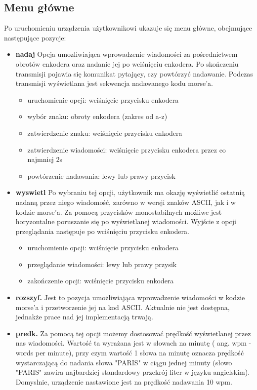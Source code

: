 \documentclass{article}
\begin{document}
\subsection{Menu główne}
Po uruchomieniu urządzenia użytkownikowi ukazuje się menu główne, obejmujące następujące pozycje:

\begin{itemize}
	\item	\textbf{nadaj}\newline
Opcja umozliwiająca wprowadzenie wiadomości za pośrednictwem obrotów enkodera oraz nadanie jej po wciśnięciu enkodera. Po skończeniu transmisji pojawia się komunikat pytający, czy powtórzyć nadawanie. Podczas transmisji wyświetlana jest sekwencja nadawanego kodu morse'a.

	\begin{itemize}
	\item uruchomienie opcji: wciśnięcie przycisku enkodera
	\item wybór znaku: obroty enkodera (zakres od a-z)
	\item zatwierdzenie znaku: wciśnięcie przycisku enkodera
	\item zatwierdzenie wiadomości: wciśnięcie przycisku enkodera przez co najmniej 2s
	\item powtórzenie nadawania: lewy lub prawy przycisk
	\end{itemize}

	\item	\textbf{wyswietl}\newline
Po wybraniu tej opcji, użytkownik ma okazję wyświetlić ostatnią nadaną przez niego wiadomość, zarówno w wersji znaków ASCII, jak i w kodzie morse'a. Za pomocą przycisków monostabilnych możliwe jest horyzontalne poruszanie się po wyświetlanej wiadomości. Wyjście z opcji przeglądania następuje po wciśnięciu przycisku enkodera.

	\begin{itemize}
	\item uruchomienie opcji: wciśnięcie przycisku enkodera
	\item przeglądanie wiadomości: lewy lub prawy przysik
	\item zakończenie opcji: wciśnięcie przycisku enkodera
	\end{itemize}

	\item	\textbf{rozszyf.}\newline
Jest to pozycja umożliwiająca wprowadzenie wiadomości w kodzie morse'a i przetworzenie jej na kod ASCII. Aktualnie nie jest dostępna, jednakże prace nad jej implementacją trwają.
	\item	\textbf{predk.}\newline
Za pomocą tej opcji możemy dostosować prędkość wyświetlanej przez nas wiadomości. Wartość ta wyrażana jest w słowach na minutę ( ang. wpm - words per minute), przy czym wartość 1 słowa na minutę oznacza prędkość wystarczającą do nadania słowa "PARIS" w ciągu jednej minuty (słowo "PARIS" zawira najbardziej standardowy przekrój liter w języku angielskim). Domyslnie, urządzenie nastawione jest na prędkość nadawania 10 wpm.


\end{itemize}
\end{document}
